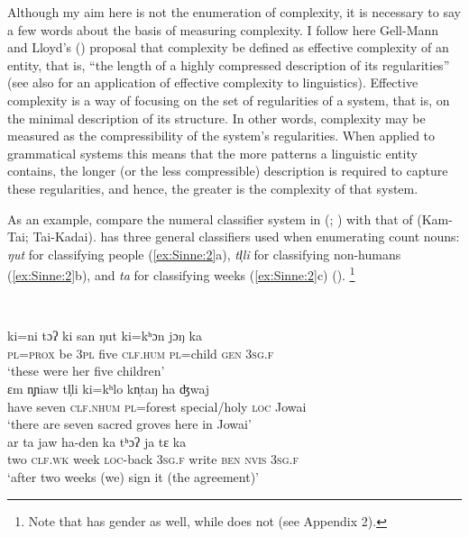 \documentclass[output=collectionpaper]{langsci/langscibook}
\begin{document}
Although my aim here is not the enumeration of complexity, it is necessary to say a few words about the basis of measuring complexity. I follow here Gell-Mann and Lloyd's (\citeyear[387]{Gell-Mann2004}) proposal that complexity be defined as effective complexity of an entity, that is, ``the length of a highly compressed description of its regularities'' (see also \citealt{Dahl2004} for an application of effective complexity to linguistics). Effective complexity is a way of focusing on the set of regularities of a system, that is, on the minimal description of its structure. In other words, complexity may be measured as the compressibility of the system's regularities. When applied to grammatical systems this means that the more patterns a linguistic entity contains, the longer (or the less compressible) description is required to capture these regularities, and hence, the greater is the complexity of that system.

As an example, compare the numeral classifier system in  (; ) with that of  (Kam-Tai; Tai-Kadai).  has three general classifiers used when enumerating count nouns: \textit{ŋut} for classifying people (\ref{ex:Sinne:2}a), \textit{tl̩li} for classifying non-humans (\ref{ex:Sinne:2}b), and \textit{ta} for classifying weeks (\ref{ex:Sinne:2}c) (\citealt[124--125, 361--362]{Ring2015}).%
\footnote{Note that  has gender as well, while  does not (see Appendix 2).
} %

\ea
\label{ex:Sinne:2}
\\
\begin{xlist}
\ex
\gll ki=ni  tɔʔ ki san ŋut ki=kʰɔn jɔŋ ka\\
\textsc{pl=prox} be \textsc{3pl} five \textsc{clf.hum} \textsc{pl}=child \textsc{gen} \textsc{3sg.f}\\
\glt `these were her five children'\\
\ex
\gll ɛm n̩ɲiaw tl̩li ki=kʰlo kn̩taŋ ha ʤwaj\\
have seven \textsc{clf.nhum} \textsc{pl}=forest special/holy \textsc{loc} Jowai\\
\glt `there are seven sacred groves here in Jowai'\\
\ex
\gll ar ta jaw ha-den ka tʰɔʔ ja tɛ ka\\
two \textsc{clf.wk} week \textsc{loc}{}-back \textsc{3sg.f} write \textsc{ben} \textsc{nvis} \textsc{3sg.f}\\
\glt  `after two weeks (we) sign it (the agreement)'\\
\end{xlist}
\z
\end{document}
